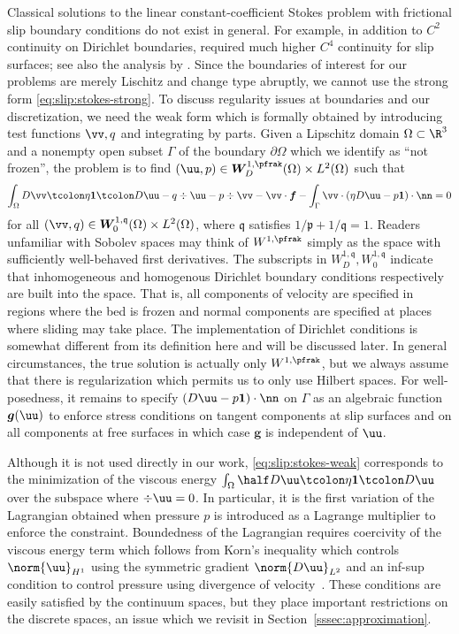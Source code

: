 Classical solutions to the linear constant-coefficient Stokes problem with frictional slip boundary conditions do not exist in general.
For example, in addition to $C^2$ continuity on Dirichlet boundaries, \citet{saito2004stokes} required much higher $C^4$ continuity for slip surfaces; see also the analysis by \citet{fujita2002coherent}.
Since the boundaries of interest for our problems are merely Lischitz and change type abruptly, we cannot use the strong form \eqref{eq:slip:stokes-strong}.
To discuss regularity issues at boundaries and our discretization, we need the weak form which is formally obtained by introducing test functions $\vv,q$ and integrating by parts.
Given a Lipschitz domain $\Omega \subset \R^3$ and a nonempty open subset $\Gamma$ of the boundary $\partial\Omega$ which we identify as ``not frozen'', the problem is to find $(\uu,p) \in \bm W_D^{1,\pfrak}(\Omega) \times L^2(\Omega)$ such that
\begin{equation}\label{eq:slip:stokes-weak}
  \int_\Omega D\vv\tcolon \eta\bm 1 \tcolon D\uu - q\div\uu - p\div\vv - \vv\cdot\bm f
  - \int_\Gamma \vv\cdot (\eta D\uu - p\bm 1)\cdot\nn = 0
\end{equation}
for all $(\vv,q)\in \bm W_0^{1,\mathfrak{q}}(\Omega) \times L^2(\Omega)$, where $\mathfrak q$ satisfies $1/\mathfrak p + 1/\mathfrak q = 1$.
Readers unfamiliar with Sobolev spaces may think of $W^{1,\pfrak}$ simply as the space with sufficiently well-behaved first derivatives.
The subscripts in $W_D^{1,\mathfrak{q}},W_0^{1,\mathfrak{q}}$ indicate that inhomogeneous and homogenous Dirichlet boundary conditions respectively are built into the space.
That is, all components of velocity are specified in regions where the bed is frozen and normal components are specified at places where sliding may take place.
The implementation of Dirichlet conditions is somewhat different from its definition here and will be discussed later.
In general circumstances, the true solution is actually only $W^{1,\pfrak}$, but we always assume that there is regularization which permits us to only use Hilbert spaces.
For well-posedness, it remains to specify $(D\uu - p\bm 1)\cdot\nn$ on $\Gamma$ as an algebraic function $\bm g(\uu)$ to enforce stress conditions on tangent components at slip surfaces and on all components at free surfaces in which case $\bm g$ is independent of $\uu$.

Although it is not used directly in our work, \eqref{eq:slip:stokes-weak} corresponds to the minimization of the viscous energy $\int_\Omega \half D\uu\tcolon \eta\bm 1 \tcolon D\uu$ over the subspace where $\div\uu = 0$.
In particular, it is the first variation of the Lagrangian obtained when pressure $p$ is introduced as a Lagrange multiplier to enforce the constraint.
Boundedness of the Lagrangian requires coercivity of the viscous energy term which follows from Korn's inequality which controls $\norm{\uu}_{H^1}$ using the symmetric gradient $\norm{D\uu}_{L^2}$
and an inf-sup condition to control pressure using divergence of velocity~\citep{evans1998partial,brenner2008mathematical}.
These conditions are easily satisfied by the continuum spaces, but they place important restrictions on the discrete spaces, an issue which we revisit in Section~\ref{sssec:approximation}.

